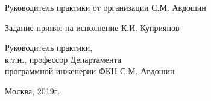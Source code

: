 \documentclass[russian, a4paper, 12pt]{article}
\begin{document}
{\hfill \break}
Руководитель практики от организации
\hspace{1cm}\underline{\hspace{3cm}}\hspace{1cm} С.М. Авдошин

{\hfill \break}
Задание принял на исполнение
\hspace{2.7cm}\underline{\hspace{3cm}}\hspace{1cm} К.И. Куприянов

{\hfill \break}
Руководитель практики, \\к.т.н., профессор Департамента\\программной инженерии ФКН
\hspace{2.8cm}\underline{\hspace{3cm}}\hspace{1cm} С.М. Авдошин

\begin{center}
    Москва, 2019г.
\end{center}
\end{document}
